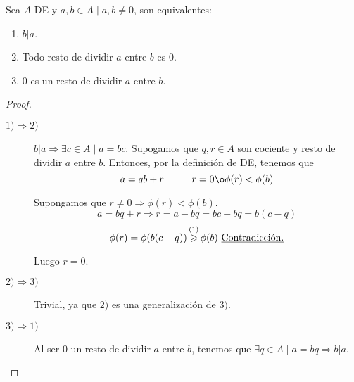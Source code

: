 \begin{prop}
    Sea $A$ DE y $a,b \in A \mid a,b \neq 0$, son equivalentes:
    \begin{enumerate}
        \item $b|a$.
        \item Todo resto de dividir $a$ entre $b$ es 0.
        \item 0 es un resto de dividir $a$ entre $b$.
    \end{enumerate}
\end{prop}
\begin{proof}\
\begin{description}
    \item [$1) \Longrightarrow 2)$]
    $b|a \Longrightarrow \exists c \in A \mid a=bc$.
    Supogamos que $q,r \in A$ son cociente y resto de dividir $a$ entre $b$. Entonces, por la definición de DE, tenemos que
    $$a=qb+r\hspace{1cm}r=0 \o \phi(r) < \phi(b)$$

    Supongamos que $r\neq0 \Longrightarrow \phi(r)<\phi(b)$.
    $$a=bq+r \Longrightarrow r=a-bq = bc-bq = b(c-q)$$
    $$\phi(r) = \phi(b(c-q)) \mathop{\geq}^{(1)} \phi(b) \mbox{ \underline{Contradicción.}}$$

    Luego $r=0$.

    \item [$2) \Longrightarrow 3)$] Trivial, ya que $2)$ es una generalización de $3).$

    \item [$3) \Longrightarrow 1)$] Al ser $0$ un resto de dividir $a$ entre $b$, tenemos que $\exists q \in A \mid a = bq \Longrightarrow b|a$.
\end{description}
\end{proof}

